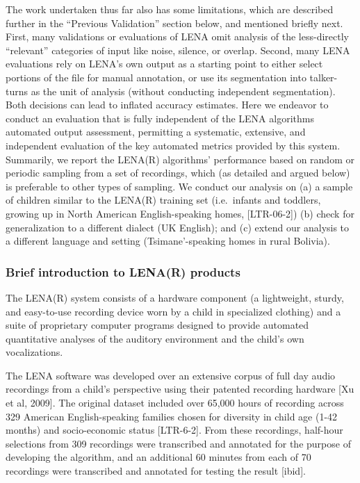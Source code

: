 \documentclass[english,floatsintext,man]{apa6}
\begin{document}
The work undertaken thus far also has some limitations, which are
described further in the \enquote{Previous Validation} section below,
and mentioned briefly next. First, many validations or evaluations of
LENA omit analysis of the less-directly \enquote{relevant} categories of
input like noise, silence, or overlap. Second, many LENA evaluations
rely on LENA's own output as a starting point to either select portions
of the file for manual annotation, or use its segmentation into
talker-turns as the unit of analysis (without conducting independent
segmentation). Both decisions can lead to inflated accuracy estimates.
Here we endeavor to conduct an evaluation that is fully independent of
the LENA algorithms automated output assessment, permitting a
systematic, extensive, and independent evaluation of the key automated
metrics provided by this system. Summarily, we report the LENA(R)
algorithms' performance based on random or periodic sampling from a set
of recordings, which (as detailed and argued below) is preferable to
other types of sampling. We conduct our analysis on (a) a sample of
children similar to the LENA(R) training set (i.e.~infants and toddlers,
growing up in North American English-speaking homes, {[}LTR-06-2{]}) (b)
check for generalization to a different dialect (UK English); and (c)
extend our analysis to a different language and setting
(Tsimane'-speaking homes in rural Bolivia).

\subsubsection{Brief introduction to LENA(R)
products}\label{brief-introduction-to-lenar-products}

The LENA(R) system consists of a hardware component (a lightweight,
sturdy, and easy-to-use recording device worn by a child in specialized
clothing) and a suite of proprietary computer programs designed to
provide automated quantitative analyses of the auditory environment and
the child's own vocalizations.

The LENA software was developed over an extensive corpus of full day
audio recordings from a child's perspective using their patented
recording hardware {[}Xu et al, 2009{]}. The original dataset included
over 65,000 hours of recording across 329 American English-speaking
families chosen for diversity in child age (1-42 months) and
socio-economic status {[}LTR-6-2{]}. From these recordings, half-hour
selections from 309 recordings were transcribed and annotated for the
purpose of developing the algorithm, and an additional 60 minutes from
each of 70 recordings were transcribed and annotated for testing the
result {[}ibid{]}.
\end{document}
